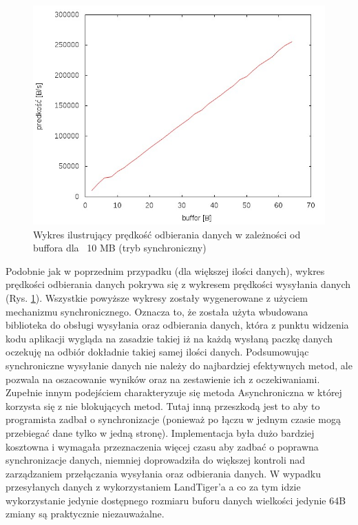 \documentclass{BscUS}
\begin{document}
\begin{figure}[h]
{
\centering
\includegraphics[width=1\textwidth]{./img/S_10737420Receive}
\caption{Wykres ilustrujący prędkość odbierania danych w zależności od buffora dla ~10 MB (tryb synchroniczny)}
\label{fig:S_10737420Receive}
}
\end{figure}
\noindent Podobnie jak w poprzednim przypadku (dla większej ilości danych), wykres prędkości odbierania danych pokrywa się z wykresem prędkości wysyłania danych (Rys. \ref{fig:S_10737420Receive}).
\newline
\indent Wszystkie powyższe wykresy zostały wygenerowane z użyciem mechanizmu synchronicznego. Oznacza to, że została użyta wbudowana biblioteka do obsługi wysyłania oraz odbierania danych, która z punktu widzenia kodu aplikacji wygląda na zasadzie takiej iż na każdą wysłaną paczkę danych oczekuję na odbiór dokładnie takiej samej ilości danych. Podsumowując synchroniczne wysyłanie danych nie należy do najbardziej efektywnych metod, ale pozwala na oszacowanie wyników oraz na zestawienie ich z oczekiwaniami.
\newline
\indent Zupełnie innym podejściem charakteryzuje się metoda Asynchroniczna w której korzysta się z nie blokujących metod. Tutaj inną przeszkodą jest to aby to programista zadbał o synchronizacje (ponieważ po łączu w jednym czasie mogą przebiegać dane tylko w jedną stronę). Implementacja była dużo bardziej kosztowna i wymagała przeznaczenia więcej czasu aby zadbać o poprawna synchronizacje danych, niemniej doprowadziła do większej kontroli nad zarządzaniem przełączania wysyłania oraz odbierania danych. W wypadku przesyłanych danych z wykorzystaniem LandTiger'a a co za tym idzie wykorzystanie jedynie dostępnego rozmiaru buforu danych wielkości jedynie 64B zmiany są praktycznie niezauważalne.
\end{document}

